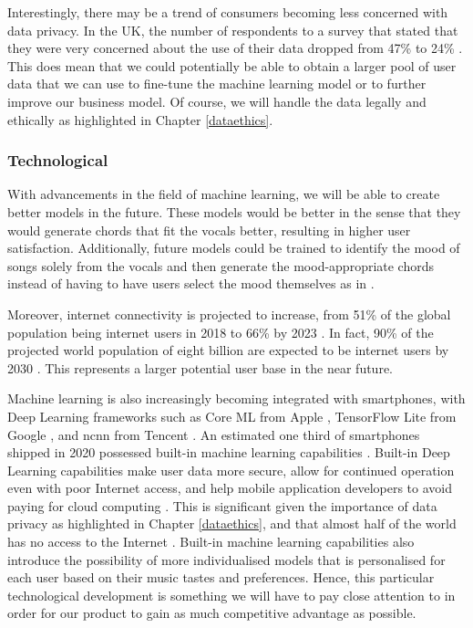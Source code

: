   Interestingly, there may be a trend of consumers becoming less concerned with data privacy. In the UK, the number of respondents to a survey that stated that they were very concerned about the use of their data dropped from 47\% to 24\% \cite{DeloitteData}. This does mean that we could potentially be able to obtain a larger pool of user data that we can use to fine-tune the machine learning model or to further improve our business model. Of course, we will handle the data legally and ethically as highlighted in Chapter \ref{dataethics}.

  \subsubsection{Technological}
  With advancements in the field of machine learning, we will be able to create better models in the future. These models would be better in the sense that they would generate chords that fit the vocals better, resulting in higher user satisfaction. Additionally, future models could be trained to identify the mood of songs solely from the vocals and then generate the mood-appropriate chords instead of having to have users select the mood themselves as in \cite{MySong}.

  Moreover, internet connectivity is projected to increase, from 51\% of the global population being internet users in 2018 to 66\% by 2023 \cite{cisco_2022}. In fact, 90\% of the projected world population of eight billion are expected to be internet users by 2030 \cite{cybersecurityventures}. This represents a larger potential user base in the near future.

  Machine learning is also increasingly becoming integrated with smartphones, with Deep Learning frameworks such as Core ML from Apple \cite{applecoreml}, TensorFlow Lite from Google \cite{tensorflow}, and ncnn from Tencent \cite{tencent}. An estimated one third of smartphones shipped in 2020 possessed built-in machine learning capabilities \cite{counterpointML}. Built-in Deep Learning capabilities make user data more secure, allow for continued operation even with poor Internet access, and help mobile application developers to avoid paying for cloud computing \cite{10.1145/2644865.2541967} \cite{https://doi.org/10.48550/arxiv.1704.04861} \cite{DL3} \cite{7460664} \cite{10.1145/2750858.2804262} \cite{10.1145/3210240.3210337} \cite{10.1145/3241539.3241563} \cite{10.1145/3005448}. This is significant given the importance of data privacy as highlighted in Chapter \ref{dataethics}, and that almost half of the world has no access to the Internet \cite{cisco_2022}. Built-in machine learning capabilities also introduce the possibility of more individualised models that is personalised for each user based on their music tastes and preferences. Hence, this particular technological development is something we will have to pay close attention to in order for our product to gain as much competitive advantage as possible.

